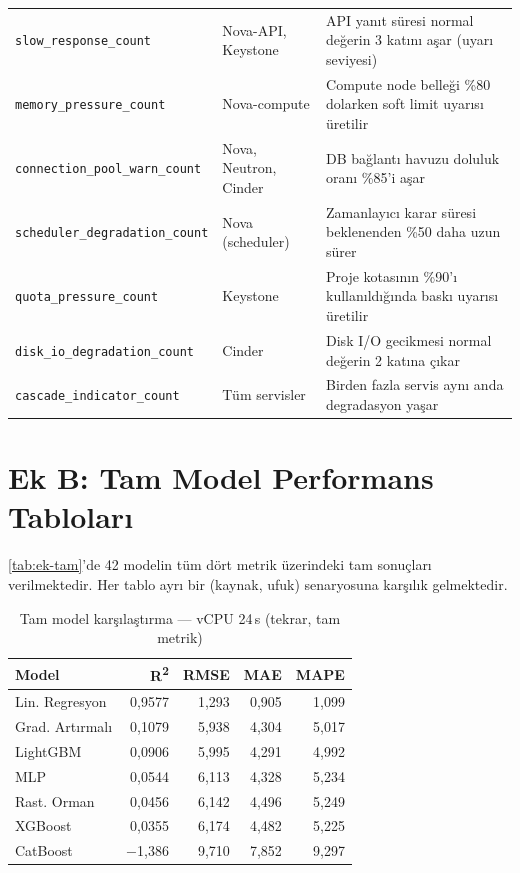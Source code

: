 \begin{ekler}
\begin{table}[htbp]
\begin{tabular}{p{4.2cm}p{2.8cm}p{6.2cm}}
        \hline
        \texttt{slow\_response\_count}        & Nova-API, Keystone     & API yanıt süresi normal değerin 3 katını aşar (uyarı seviyesi) \\
        \texttt{memory\_pressure\_count}      & Nova-compute           & Compute node belleği \%80 dolarken soft limit uyarısı üretilir \\
        \texttt{connection\_pool\_warn\_count} & Nova, Neutron, Cinder  & DB bağlantı havuzu doluluk oranı \%85'i aşar \\
        \texttt{scheduler\_degradation\_count}& Nova (scheduler)       & Zamanlayıcı karar süresi beklenenden \%50 daha uzun sürer \\
        \texttt{quota\_pressure\_count}       & Keystone               & Proje kotasının \%90'ı kullanıldığında baskı uyarısı üretilir \\
        \texttt{disk\_io\_degradation\_count} & Cinder                 & Disk I/O gecikmesi normal değerin 2 katına çıkar \\
        \texttt{cascade\_indicator\_count}    & Tüm servisler          & Birden fazla servis aynı anda degradasyon yaşar \\
    \end{tabular}
\end{table}


\section*{Ek B: Tam Model Performans Tabloları}

\autoref{tab:ek-tam}'de 42 modelin tüm dört metrik üzerindeki tam sonuçları verilmektedir. Her tablo ayrı bir (kaynak, ufuk) senaryosuna karşılık gelmektedir.

\begin{table}[htbp]
    \centering
    \caption{Tam model karşılaştırma — vCPU 24\,s (tekrar, tam metrik)}
    \label{tab:ek-tam}
    \begin{tabular}{lrrrr}
        \textbf{Model} & \textbf{R\textsuperscript{2}} & \textbf{RMSE} & \textbf{MAE} & \textbf{MAPE} \\
        \hline
        Lin. Regresyon  & 0{,}9577 & 1{,}293  & 0{,}905 & 1{,}099 \\
        Grad. Artırmalı & 0{,}1079 & 5{,}938  & 4{,}304 & 5{,}017 \\
        LightGBM        & 0{,}0906 & 5{,}995  & 4{,}291 & 4{,}992 \\
        MLP             & 0{,}0544 & 6{,}113  & 4{,}328 & 5{,}234 \\
        Rast. Orman     & 0{,}0456 & 6{,}142  & 4{,}496 & 5{,}249 \\
        XGBoost         & 0{,}0355 & 6{,}174  & 4{,}482 & 5{,}225 \\
        CatBoost        & $-$1{,}386 & 9{,}710 & 7{,}852 & 9{,}297 \\
    \end{tabular}
\end{table}


\end{ekler}
